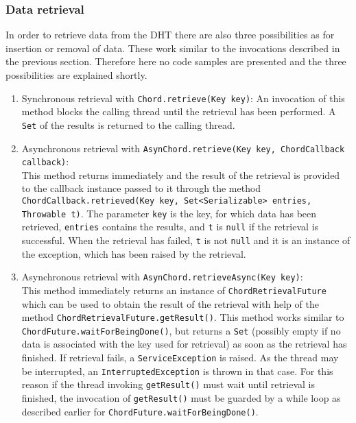 \subsubsection{Data retrieval} 
In order to retrieve data from the DHT there are also three possibilities as for 
insertion or removal of data. These work similar to the invocations described in 
the previous section. Therefore here no code samples are presented and the three 
possibilities are explained shortly. 
\begin{enumerate}
%
\item Synchronous retrieval with {\tt Chord.retrieve(Key key)}: An invocation of this 
method blocks the calling thread until the retrieval has been performed. A {\tt Set} 
of the results is returned to the calling thread. 
%
\item Asynchronous retrieval with 
{\tt AsynChord.retrieve(Key key, ChordCallback callback)}:\\ 
This method returns 
immediately and the result of the retrieval is provided to the callback instance 
passed to it through the method 
{\tt ChordCallback.retrieved(Key key, Set<Serializable> entries, Throwable t)}. 
The parameter {\tt key} is the key, for which data has been retrieved, {\tt entries} 
contains the results, and {\tt t} is {\tt null} if the retrieval is successful. 
When the retrieval has failed, {\tt t} is not {\tt null} and it is an instance of the exception, which has been raised by the retrieval. 
%
\item Asynchronous retrieval with {\tt AsynChord.retrieveAsync(Key key)}: \\
This method immediately returns an instance 
of {\tt ChordRetrievalFuture} which can be used to obtain the result of the retrieval 
with help of the method {\tt ChordRetrievalFuture.getResult()}. This method works similar 
to {\tt ChordFuture.waitForBeingDone()}, but returns a {\tt Set} (possibly empty if 
no data is associated with the key used for retrieval) as soon as the retrieval has 
finished. If retrieval fails, a {\tt ServiceException} is raised. As the thread may 
be interrupted, an {\tt InterruptedException} is thrown in that case. For this reason 
if the thread invoking {\tt getResult()} must wait until retrieval is finished, the 
invocation of {\tt getResult()} must be guarded by a while loop as described earlier 
for {\tt ChordFuture.waitForBeingDone()}. 
%
\end{enumerate}


